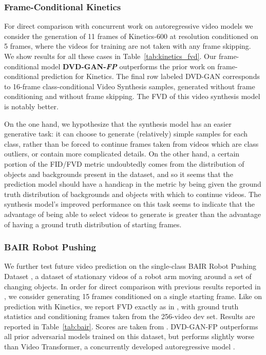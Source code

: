 \documentclass{article} \usepackage{iclr2020_conference,times}
\begin{document}
\subsubsection{Frame-Conditional Kinetics}
\label{ss:fc_kinetics}

For direct comparison with concurrent work on autoregressive video models \citep{weissenborn2019scaling} we consider the generation of 11 frames of Kinetics-600 at  resolution conditioned on 5 frames, where the videos for training are not taken with any frame skipping.
We show results for all these cases in Table~\ref{tab:kinetics_fvd}. Our frame-conditional model \textbf{DVD-GAN-\textit{FP}} outperforms the prior work on frame-conditional prediction for Kinetics.
The final row labeled DVD-GAN corresponds to 16-frame class-conditional Video Synthesis samples, generated without frame conditioning and without frame skipping. The FVD of this video synthesis model is notably better.

On the one hand, we hypothesize that the synthesis model has an easier generative task: it can choose to generate (relatively) simple samples for each class, rather than be forced to continue frames taken from videos which are class outliers, or contain more complicated details. On the other hand, a certain portion of the FID/FVD metric undoubtedly comes from the distribution of objects and backgrounds present in the dataset, and so it seems that the prediction model should have a handicap in the metric by being given the ground truth distribution of backgrounds and objects with which to continue videos. The synthesis model's improved performance on this task seems to indicate that the advantage of being able to select videos to generate is greater than the advantage of having a ground truth distribution of starting frames.

\subsubsection{BAIR Robot Pushing}

We further test future video prediction on the single-class BAIR Robot Pushing Dataset \citep{ebert2017self}, a dataset of stationary videos of a robot arm moving around a set of changing objects. In order for direct comparison with previous results reported in \citet{unterthiner2018towards}, we consider generating 15 frames conditioned on a single starting frame. Like on prediction with Kinetics, we report FVD exactly as in \citet{unterthiner2018towards}, with ground truth statistics and conditioning frames taken from the 256-video dev set. Results are reported in Table~\ref{tab:bair}. Scores are taken from \citet{unterthiner2018towards}. DVD-GAN-FP outperforms all prior adversarial models trained on this dataset, but performs slightly worse than Video Transformer, a concurrently developed autoregressive model \citet{weissenborn2019scaling}. 
\end{document}
